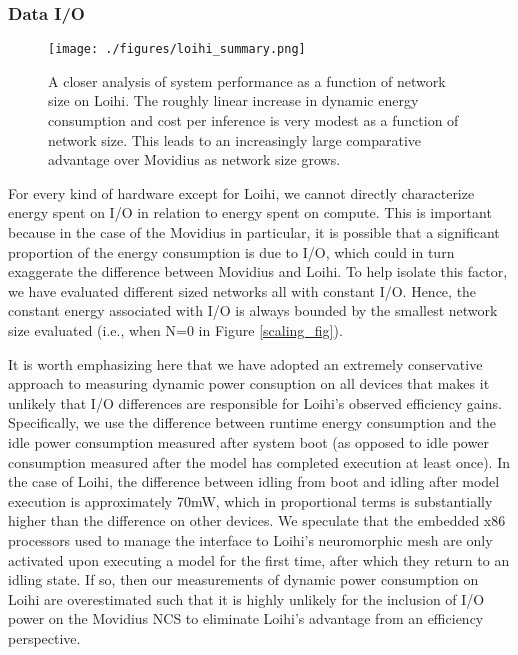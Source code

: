 \documentclass[sigconf, screen]{acmart}
\begin{document}
\subsubsection{Data I/O}


\begin{figure*}[ht!]
\centering
    \texttt{[image: ./figures/loihi\_summary.png]}
    \caption{A closer analysis of system performance as a function of network size on Loihi. The roughly linear increase in dynamic energy consumption and cost per inference is very modest as a function of network size. This leads to an increasingly large comparative advantage over Movidius as network size grows.}
\label{loihi_fig}
\end{figure*}

For every kind of hardware except for Loihi, we cannot directly characterize energy spent on I/O in relation to energy spent on compute. This is important because in the case of the Movidius in particular, it is possible that a significant proportion of the energy consumption is due to I/O, which could in turn exaggerate the difference between Movidius and Loihi. To help isolate this factor, we have evaluated different sized networks all with constant I/O. Hence, the constant energy associated with I/O is always bounded by the smallest network size evaluated (i.e., when N=0 in Figure \ref{scaling_fig}).

It is worth emphasizing here that we have adopted an extremely conservative approach to measuring dynamic power consuption on all devices that makes it unlikely that I/O differences are responsible for Loihi's observed efficiency gains. Specifically, we use the difference between runtime energy consumption and the idle power consumption measured after system boot (as opposed to idle power consumption measured after the model has completed execution at least once). In the case of Loihi, the difference between idling from boot and idling after model execution is approximately 70mW, which in proportional terms is substantially higher than the difference on other devices. We speculate that the embedded x86 processors used to manage the interface to Loihi's neuromorphic mesh are only activated upon executing a model for the first time, after which they return to an idling state. If so, then our measurements of dynamic power consumption on Loihi are overestimated such that it is highly unlikely for the inclusion of I/O power on the Movidius NCS to eliminate Loihi's advantage from an efficiency perspective. 
\end{document}
